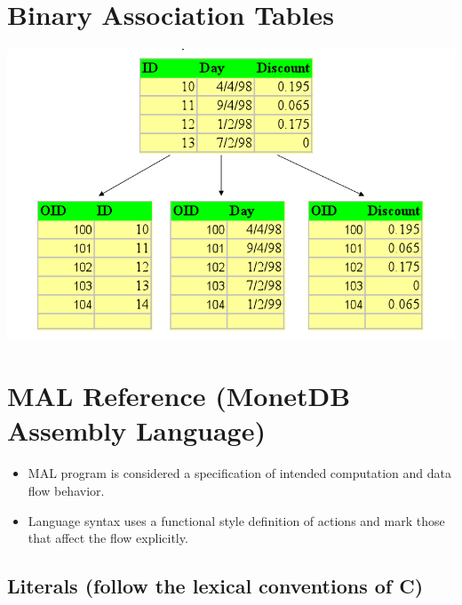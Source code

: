 \documentclass[11pt]{article}
\begin{document}
\section{Binary Association Tables}
\label{sec:orgb942641}

\begin{center}
\includegraphics[width=.9\linewidth]{./Pictures/BAT.png}
\end{center}


\section{MAL Reference (MonetDB Assembly Language)}
\label{sec:orgfa7a4bd}

\begin{itemize}
\item MAL program is considered a specification of intended computation and data flow behavior.
\item Language syntax uses a functional style definition of actions and mark those that affect the flow explicitly.
\end{itemize}

\subsection{Literals (follow the lexical conventions of C)}
\label{sec:orgacbe5b3}
\end{document}
